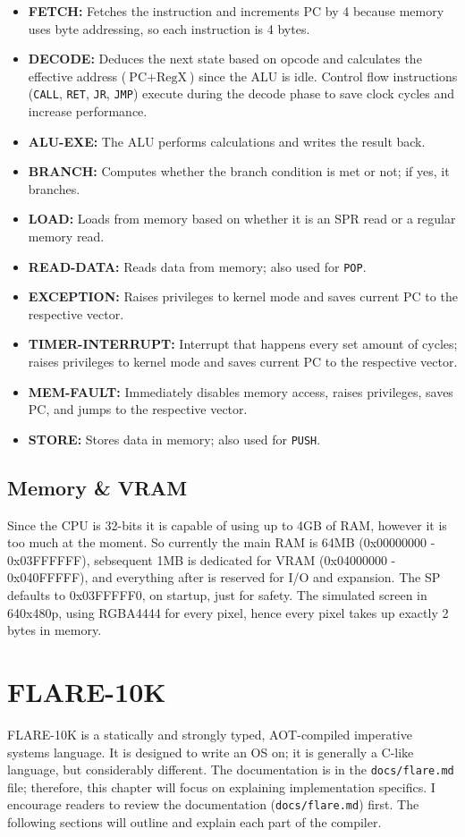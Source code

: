 \documentclass{article}
\begin{document}
\begin{itemize}
    \item \textbf{FETCH:} Fetches the instruction and increments PC by 4 because memory uses byte addressing, so each instruction is 4 bytes.
    \item \textbf{DECODE:} Deduces the next state based on opcode and calculates the effective address ($\text{PC} + \text{RegX}$) since the ALU is idle. Control flow instructions (\texttt{CALL}, \texttt{RET}, \texttt{JR}, \texttt{JMP}) execute during the decode phase to save clock cycles and increase performance.
    \item \textbf{ALU-EXE:} The ALU performs calculations and writes the result back.
    \item \textbf{BRANCH:} Computes whether the branch condition is met or not; if yes, it branches.
    \item \textbf{LOAD:} Loads from memory based on whether it is an SPR read or a regular memory read.
    \item \textbf{READ-DATA:} Reads data from memory; also used for \texttt{POP}.
    \item \textbf{EXCEPTION:} Raises privileges to kernel mode and saves current PC to the respective vector.
    \item \textbf{TIMER-INTERRUPT:} Interrupt that happens every set amount of cycles; raises privileges to kernel mode and saves current PC to the respective vector.
    \item \textbf{MEM-FAULT:} Immediately disables memory access, raises privileges, saves PC, and jumps to the respective vector.
    \item \textbf{STORE:} Stores data in memory; also used for \texttt{PUSH}.
\end{itemize}

\subsection{Memory & VRAM}
Since the CPU is 32-bits it is capable of using up to 4GB of RAM, however it is too much at the moment. So currently the main RAM is 64MB (0x00000000 - 0x03FFFFFF), sebsequent 1MB is dedicated for VRAM (0x04000000 - 0x040FFFFF), and everything after is reserved for I/O and expansion. The SP defaults to 0x03FFFFF0, on startup, just for safety. The simulated screen in 640x480p, using RGBA4444 for every pixel, hence every pixel takes up exactly 2 bytes in memory.

\section{FLARE-10K}
FLARE-10K is a statically and strongly typed, AOT-compiled imperative systems language. It is designed to write an OS on; it is generally a C-like language, but considerably different. The documentation is in the \texttt{docs/flare.md} file; therefore, this chapter will focus on explaining implementation specifics. I encourage readers to review the documentation (\texttt{docs/flare.md}) first. The following sections will outline and explain each part of the compiler.
\end{document}
